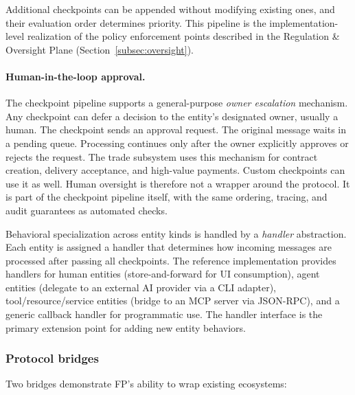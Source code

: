 \noindent Additional checkpoints can be appended without modifying
existing ones, and their evaluation order determines priority.  This
pipeline is the implementation-level realization of the policy
enforcement points described in the Regulation \& Oversight Plane
(Section~\ref{subsec:oversight}).

\paragraph{Human-in-the-loop approval.}
The checkpoint pipeline supports a general-purpose \emph{owner
escalation} mechanism. Any checkpoint can defer a decision to the entity's designated owner, usually a human. The checkpoint sends an approval request. The original message waits in a pending queue. Processing continues only after the owner explicitly approves or rejects the request.
The trade subsystem uses this mechanism for contract creation, delivery acceptance, and high-value payments. Custom checkpoints can use it as well. Human oversight is therefore not a wrapper around the protocol. It is part of the checkpoint pipeline itself, with the same ordering, tracing, and audit guarantees as automated checks.

Behavioral specialization across entity kinds is handled by a
\emph{handler} abstraction.  Each entity is assigned a handler that
determines how incoming messages are processed after passing all
checkpoints.  The reference implementation provides handlers for human
entities (store-and-forward for UI consumption), agent entities (delegate
to an external AI provider via a CLI adapter), tool/resource/service
entities (bridge to an MCP server via JSON-RPC), and a generic callback
handler for programmatic use. The handler interface is the primary
extension point for adding new entity behaviors.

\subsubsection{Protocol bridges}

Two bridges demonstrate FP's ability to wrap existing ecosystems:

